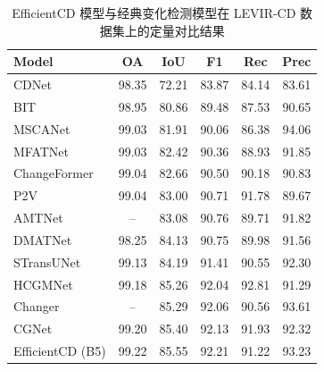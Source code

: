 \begin{table}[!htbp]
  \centering
  \caption{EfficientCD 模型与经典变化检测模型在 LEVIR-CD 数据集上的定量对比结果}
  \label{tab:efficientcd_levir}
  \begin{tabular}{lccccc}
    \toprule
    Model            &   OA   &  IoU   &   F1   &  Rec   &  Prec   \\
    \midrule
    CDNet~\cite{Alcantarilla2016StreetviewCD}            &  98.35 &  72.21 &  83.87 &  84.14 &  83.61  \\
    BIT~\cite{chen_remote_2022}              &  98.95 &  80.86 &  89.48 &  87.53 &  90.65  \\
    MSCANet~\cite{m_liu_cnn-transformer_2022}          &  99.03 &  81.91 &  90.06 &  86.38 &  94.06  \\
    MFATNet~\cite{Mao2022MFATNetMF}          &  99.03 &  82.42 &  90.36 &  88.93 &  91.85  \\
    ChangeFormer~\cite{bandara2022transformer}     &  99.04 &  82.66 &  90.50 &  90.18 &  90.83  \\
    P2V~\cite{lin_transition_2023}              &  99.04 &  83.00 &  90.71 &  91.78 &  89.67  \\
    AMTNet~\cite{Liu2023AnAM}           &   --   &  83.08 &  90.76 &  89.71 &  91.82  \\
    DMATNet~\cite{Song2022RemoteSI}          &  98.25 &  84.13 &  90.75 &  89.98 &  91.56  \\
    STransUNet~\cite{Yuan2022STransUNetAS}       &  99.13 &  84.19 &  91.41 &  90.55 &  92.30  \\
    HCGMNet~\cite{Han2023HCGMNetAH}          &  99.18 &  85.26 &  92.04 &  92.81 &  91.29  \\
    Changer~\cite{Fang2022ChangerFI}        &   --   &  85.29 &  92.06 &  90.56 &  93.61  \\
    CGNet~\cite{han_change_2023}            &  99.20 &  85.40 &  92.13 &  91.93 &  92.32  \\
    EfficientCD (B5) &  99.22 &  85.55 &  92.21 &  91.22 &  93.23  \\
    \bottomrule
  \end{tabular}
\end{table}



